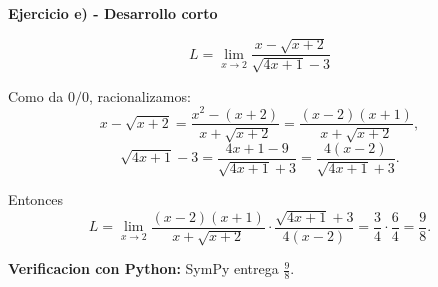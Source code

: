\documentclass[11pt]{article}
\begin{document}
\thispagestyle{empty}

\begin{center}
    {\Large\textbf{Ejercicio e) - Desarrollo corto}}
\end{center}

\[
L=\lim_{x\to 2}\frac{x-\sqrt{x+2}}{\sqrt{4x+1}-3}
\]

Como da \(0/0\), racionalizamos:
\[
x-\sqrt{x+2}
=\frac{x^2-(x+2)}{x+\sqrt{x+2}}
=\frac{(x-2)(x+1)}{x+\sqrt{x+2}},
\]
\[
\sqrt{4x+1}-3
=\frac{4x+1-9}{\sqrt{4x+1}+3}
=\frac{4(x-2)}{\sqrt{4x+1}+3}.
\]

Entonces
\[
L=\lim_{x\to 2}
\frac{(x-2)(x+1)}{x+\sqrt{x+2}}
\cdot
\frac{\sqrt{4x+1}+3}{4(x-2)}
=\frac{3}{4}\cdot\frac{6}{4}
=\boxed{\frac{9}{8}}.
\]

\vspace{0.4cm}
\noindent\textbf{Verificacion con Python:} SymPy entrega \(\frac{9}{8}\).
\end{document}
